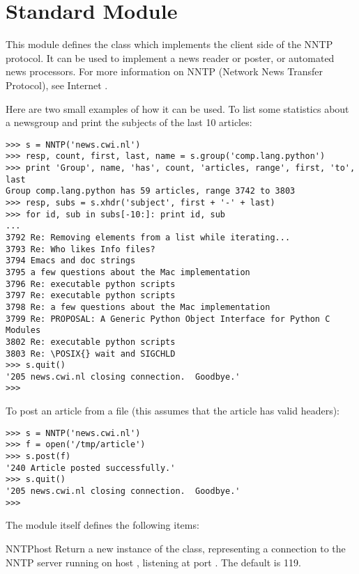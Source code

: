 \section{Standard Module }
\label{module-nntplib}


This module defines the class  which implements the client
side of the NNTP protocol.  It can be used to implement a news reader
or poster, or automated news processors.  For more information on NNTP
(Network News Transfer Protocol), see Internet .

Here are two small examples of how it can be used.  To list some
statistics about a newsgroup and print the subjects of the last 10
articles:

\begin{verbatim}
>>> s = NNTP('news.cwi.nl')
>>> resp, count, first, last, name = s.group('comp.lang.python')
>>> print 'Group', name, 'has', count, 'articles, range', first, 'to', last
Group comp.lang.python has 59 articles, range 3742 to 3803
>>> resp, subs = s.xhdr('subject', first + '-' + last)
>>> for id, sub in subs[-10:]: print id, sub
... 
3792 Re: Removing elements from a list while iterating...
3793 Re: Who likes Info files?
3794 Emacs and doc strings
3795 a few questions about the Mac implementation
3796 Re: executable python scripts
3797 Re: executable python scripts
3798 Re: a few questions about the Mac implementation 
3799 Re: PROPOSAL: A Generic Python Object Interface for Python C Modules
3802 Re: executable python scripts 
3803 Re: \POSIX{} wait and SIGCHLD
>>> s.quit()
'205 news.cwi.nl closing connection.  Goodbye.'
>>> 
\end{verbatim}

To post an article from a file (this assumes that the article has
valid headers):

\begin{verbatim}
>>> s = NNTP('news.cwi.nl')
>>> f = open('/tmp/article')
>>> s.post(f)
'240 Article posted successfully.'
>>> s.quit()
'205 news.cwi.nl closing connection.  Goodbye.'
>>> 
\end{verbatim}
%
The module itself defines the following items:

\begin{funcdesc}{NNTP}{host}
Return a new instance of the  class, representing a
connection to the NNTP server running on host , listening at
port .  The default  is 119.
\end{funcdesc}

